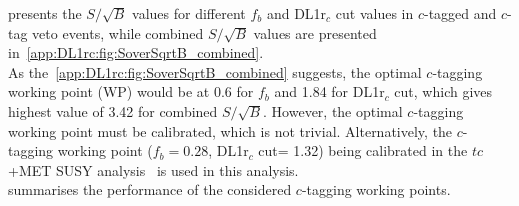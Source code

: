 \noindent {} presents the $S/\sqrt{B}$ values for different $f_b$ and DL1r$_c$ cut values in $c$-tagged and $c$-tag veto events,
while combined $S/\sqrt{B}$ values are presented in~\cref{app:DL1rc:fig:SoverSqrtB_combined}.\\
\noindent As the~\cref{app:DL1rc:fig:SoverSqrtB_combined} suggests, the optimal $c$-tagging working point (WP) would be at 0.6 for $f_b$ and 1.84 for DL1r$_c$ cut, which gives
highest value of 3.42 for combined $S/\sqrt{B}$. 
However, the optimal $c$-tagging working point must be calibrated, which is not trivial.
\noindent Alternatively, the $c$-tagging working point ($f_b=0.28$, DL1r$_c$ cut= 1.32) being calibrated in the $tc$+MET SUSY analysis~\cite{ANA-SUSY-2019-23} is used in this analysis.\\
 summarises the performance of the considered $c$-tagging working points. 

